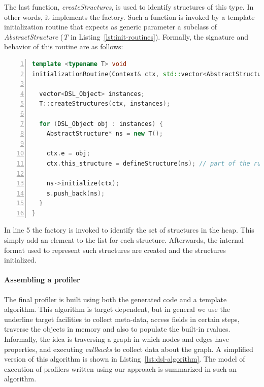 The last function, \textit{createStructures}, is used to identify structures of this type.
In other words, it implements the factory.
Such a function is invoked by a template initialization routine that expects as generic parameter a subclass of 
\textit{AbstractStructure} (\textit{T} in Listing~\ref{lst:init-routines}).
Formally, the signature and behavior of this routine are as follows:

\begin{lstlisting}[language=C++, frame=L,
numbers=left,
numberstyle=\color{black}\scriptsize,xleftmargin=2\parindent,
label=lst:init-routines, caption={Routine to initialize structures in the heap.}]
template <typename T> void
initializationRoutine(Context& ctx, std::vector<AbstractStructure*>& s){

  vector<DSL_Object> instances;
  T::createStructures(ctx, instances);
  
  for (DSL_Object obj : instances) {
    AbstractStructure* ns = new T();
    
    ctx.e = obj;
    ctx.this_structure = defineStructure(ns); // part of the runtime support
    
    ns->initialize(ctx);
    s.push_back(ns);
  }
}
\end{lstlisting}

In line 5 the factory is invoked to identify the set of structures in the heap.
This simply add an element to the list for each structure.
Afterwards, the internal format used to represent such structures are created and the structures initialized.


\paragraph{Assembling a profiler}

The final profiler is built using both the generated code and a template algorithm.
This algorithm is target dependent, but in general we use the underline target facilities to collect meta-data, access fields in certain steps, traverse the objects in memory and also to populate the built-in rvalues.
Informally, the idea is traversing a graph in which nodes and edges have properties, and executing \textit{callbacks} to collect data about the graph.
A simplified version of this algorithm is shown in Listing~\ref{lst:dsl-algorithm}. The model of execution of profilers written using our approach is summarized in such an algorithm.



